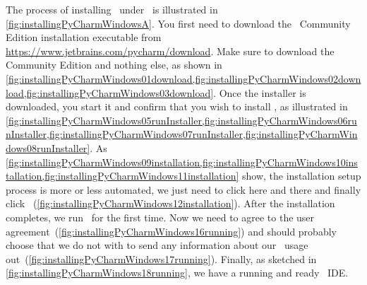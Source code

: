 %
The process of installing \pycharm\ under \windows\ is illustrated in \cref{fig:installingPyCharmWindowsA}.
You first need to download the \pycharm\ Community Edition installation executable from \url{https://www.jetbrains.com/pycharm/download}.
Make sure to download the Community Edition and nothing else, as shown in \cref{fig:installingPyCharmWindows01download,fig:installingPyCharmWindows02download,fig:installingPyCharmWindows03download}.
Once the installer is downloaded, you start it and confirm that you wish to install \pycharm, as illustrated in \cref{fig:installingPyCharmWindows05runInstaller,fig:installingPyCharmWindows06runInstaller,fig:installingPyCharmWindows07runInstaller,fig:installingPyCharmWindows08runInstaller}.
As \cref{fig:installingPyCharmWindows09installation,fig:installingPyCharmWindows10installation,fig:installingPyCharmWindows11installation} show, the installation setup process is more or less automated, we just need to click  here and there and finally click ~(\cref{fig:installingPyCharmWindows12installation}).
After the installation completes, we run \pycharm\ for the first time.
Now we need to agree to the user agreement~(\cref{fig:installingPyCharmWindows16running}) and should probably choose that we do not with to send any information about our \pycharm\ usage out~(\cref{fig:installingPyCharmWindows17running}).
Finally, as sketched in \cref{fig:installingPyCharmWindows18running}, we have a running and ready \pycharm\ \gls{IDE}.%
%
\endhsection%
%
